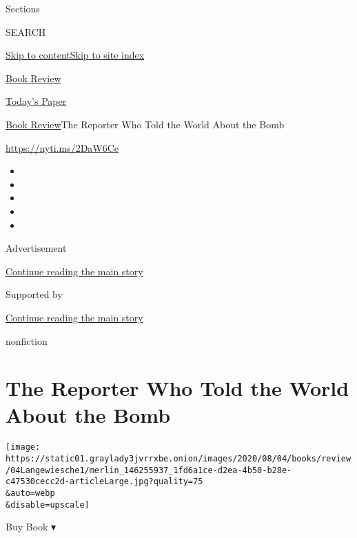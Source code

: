 Sections

SEARCH

\protect\hyperlink{site-content}{Skip to
content}\protect\hyperlink{site-index}{Skip to site index}

\href{https://www.nytimes3xbfgragh.onion/section/books/review}{Book
Review}

\href{https://myaccount.nytimes3xbfgragh.onion/auth/login?response_type=cookie\&client_id=vi}{}

\href{https://www.nytimes3xbfgragh.onion/section/todayspaper}{Today's
Paper}

\href{/section/books/review}{Book Review}\textbar{}The Reporter Who Told
the World About the Bomb

\url{https://nyti.ms/2DaW6Ce}

\begin{itemize}
\item
\item
\item
\item
\item
\end{itemize}

Advertisement

\protect\hyperlink{after-top}{Continue reading the main story}

Supported by

\protect\hyperlink{after-sponsor}{Continue reading the main story}

nonfiction

\hypertarget{the-reporter-who-told-the-world-about-the-bomb}{%
\section{The Reporter Who Told the World About the
Bomb}\label{the-reporter-who-told-the-world-about-the-bomb}}

\texttt{[image: https://static01.graylady3jvrrxbe.onion/images/2020/08/04/books/review/04Langewiesche1/merlin\_146255937\_1fd6a1ce-d2ea-4b50-b28e-c47530cecc2d-articleLarge.jpg?quality=75\\\&auto=webp\\\&disable=upscale]}

Buy Book ▾

